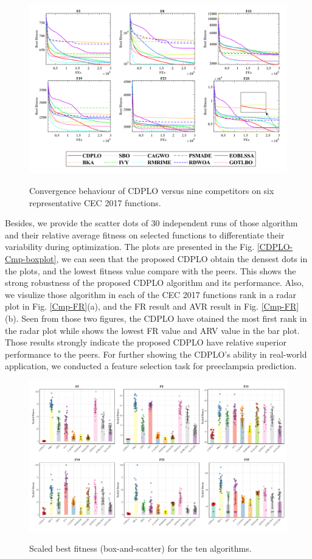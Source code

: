 \documentclass[3p]{elsarticle}
\begin{document}
\begin{figure}
\caption{Convergence behaviour of CDPLO versus nine
           competitors on six representative CEC 2017 functions.}
\includegraphics[width=\linewidth]{CDPLO-Cmp}
\label{fig: CDPLO-Cmp}
\end{figure}

Besides, we provide the scatter dots of 30 independent runs of those algorithm and their relative average fitness on selected functions to differentiate their variability during optimization. The plots are presented in the Fig. \ref{CDPLO-Cmp-boxplot}, we can seen that the proposed CDPLO obtain the densest dots in the plots, and the lowest fitness value compare with the peers. This shows the strong robustness of the proposed CDPLO algorithm and its performance. Also, we visulize those algorithm in each of the CEC 2017 functions rank in a radar plot in Fig. \ref{Cmp-FR}(a), and the FR result and AVR result in Fig. \ref{Cmp-FR}(b). Seen from those two figures, the CDPLO have otained the most first rank in the radar plot while shows the lowest FR value and ARV value in the bar plot. Those results strongly indicate the proposed CDPLO have relative superior performance to the peers. For further showing the CDPLO's ability in real-world application, we conducted a feature selection task for preeclampsia prediction.

\begin{figure}
\caption{Scaled best fitness (box-and-scatter) for the ten
           algorithms.}
\includegraphics[width=\linewidth]{CDPLO-Cmp-boxplot}
\label{fig: CDPLO-Cmp-boxplot}
\end{figure}
\end{document}
